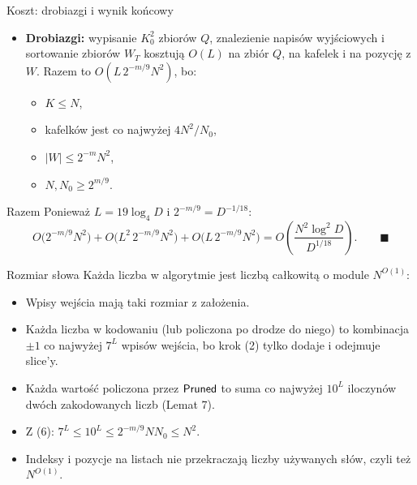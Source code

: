 \begin{frame}{Koszt: drobiazgi i wynik końcowy}
  \begin{itemize}
    \item \textbf{Drobiazgi:} wypisanie $K_0^2$ zbiorów $Q$, znalezienie napisów wyjściowych i sortowanie zbiorów $W_T$ kosztują $O(L)$
      na zbiór $Q$, na kafelek i na pozycję z $W$. Razem to $O(L\,2^{-m/9}N^2)$, bo:
      \begin{itemize}
        \item $K\le N$,
        \item kafelków jest co najwyżej $4N^2/N_0$,
        \item $|W|\le2^{-m}N^2$,
        \item $N,N_0\ge2^{m/9}$.
      \end{itemize}
  \end{itemize}
  \pause
  \begin{block}{Razem}
    Ponieważ $L=19\log_4D$ i $2^{-m/9}=D^{-1/18}$:
    \[
      O\big(2^{-m/9}N^2\big)+O\big(L^2\,2^{-m/9}N^2\big)+O\big(L\,2^{-m/9}N^2\big)
      =O\!\left(\frac{N^2\log^2D}{D^{1/18}}\right).\qquad\blacksquare
    \]
  \end{block}
\end{frame}

\begin{frame}{Rozmiar słowa}
  Każda liczba w algorytmie jest liczbą całkowitą o module $N^{O(1)}$:
  \begin{itemize}
    \item Wpisy wejścia mają taki rozmiar z założenia.
    \item<2-> Każda liczba w kodowaniu (lub policzona po drodze do niego) to kombinacja $\pm1$ co najwyżej $7^L$ wpisów wejścia,
      bo krok (2) tylko dodaje i odejmuje slice'y.
    \item<3-> Każda wartość policzona przez $\mathsf{Pruned}$ to suma co najwyżej $10^L$ iloczynów dwóch zakodowanych liczb (Lemat 7).
    \item<4-> Z (6): $7^L\le10^L\le2^{-m/9}NN_0\le N^2$.
    \item<5-> Indeksy i pozycje na listach nie przekraczają liczby używanych słów, czyli też $N^{O(1)}$.
  \end{itemize}
\end{frame}

